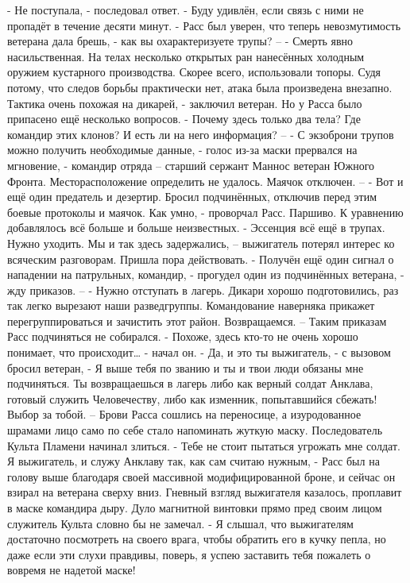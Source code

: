 \documentclass[a4paper, 12pt]{report}
\begin{document}
	- Не поступала, - последовал ответ.
	- Буду удивлён, если связь с ними не пропадёт в течение десяти минут. - Расс был уверен, что теперь невозмутимость ветерана дала брешь, - как вы охарактеризуете трупы? –
	- Смерть явно насильственная. На телах несколько открытых ран нанесённых холодным оружием кустарного производства. Скорее всего, использовали топоры. Судя потому, что следов борьбы практически нет, атака была произведена внезапно. Тактика очень похожая на дикарей, - заключил ветеран. Но у Расса было припасено ещё несколько вопросов.
	- Почему здесь только два тела? Где командир этих клонов? И есть ли на него информация? –
	- С экзоброни трупов можно получить необходимые данные, - голос из-за маски прервался на мгновение, - командир отряда – старший сержант Маннос ветеран Южного Фронта. Месторасположение определить не удалось. Маячок отключен. –
	- Вот и ещё один предатель и дезертир. Бросил подчинённых, отключив перед этим боевые протоколы и маячок. Как умно, - проворчал Расс. 
Паршиво. К уравнению добавлялось всё больше и больше неизвестных.
 - Эссенция всё ещё в трупах. Нужно уходить. Мы и так здесь задержались, – выжигатель потерял интерес ко всяческим разговорам. Пришла пора действовать.
	- Получён ещё один сигнал о нападении на патрульных, командир, - прогудел один из подчинённых ветерана, - жду приказов. –
	- Нужно отступать в лагерь. Дикари хорошо подготовились, раз так легко вырезают наши разведгруппы. Командование наверняка прикажет перегруппироваться и зачистить этот район. Возвращаемся. –
	Таким приказам Расс подчиняться не собирался.
	- Похоже, здесь кто-то не очень хорошо понимает, что происходит… - начал он.
	- Да, и это ты выжигатель, - с вызовом бросил ветеран, - Я выше тебя по званию и ты и твои люди обязаны мне подчиняться. Ты возвращаешься в лагерь либо как верный солдат Анклава, готовый служить Человечеству, либо как изменник, попытавшийся сбежать! Выбор за тобой. –
	Брови Расса сошлись на переносице, а изуродованное шрамами лицо само по себе стало напоминать жуткую маску. Последователь Культа Пламени начинал злиться.
	- Тебе не стоит пытаться угрожать мне солдат. Я выжигатель, и служу Анклаву так, как сам считаю нужным, - Расс был на голову выше благодаря своей массивной модифицированной броне, и сейчас он взирал на ветерана сверху вниз. Гневный взгляд выжигателя казалось, проплавит в маске командира дыру. Дуло магнитной винтовки прямо пред своим лицом служитель Культа словно бы не замечал.
	- Я слышал, что выжигателям достаточно посмотреть на своего врага, чтобы обратить его в кучку пепла, но даже если эти слухи правдивы, поверь, я успею заставить тебя пожалеть о вовремя не надетой маске!
\end{document}

